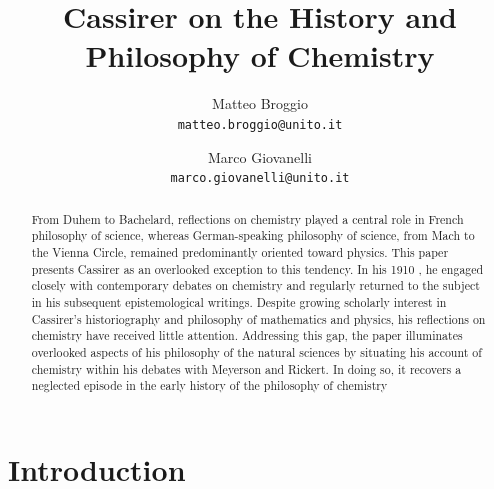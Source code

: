 \documentclass[submitted,12pt]{article}
\title{\DIFaddbegin \DIFadd{Ernst }\DIFaddend Cassirer on the History and Philosophy of Chemistry}
\author{\small
Matteo Broggio\\
  \texttt{matteo.broggio@unito.it}
  \and
\small  Marco Giovanelli\\
  \texttt{marco.giovanelli@unito.it}
}
\begin{document}
\maketitle


\begin{abstract}
From Duhem to Bachelard, reflections on chemistry played a central role in French philosophy of science, whereas German-speaking philosophy of science, from Mach to the Vienna Circle, remained predominantly oriented toward physics. This paper presents Cassirer as an overlooked exception to this tendency. In his 1910 \SFt, he engaged closely with contemporary debates on chemistry and regularly returned to the subject in his subsequent epistemological writings. Despite growing scholarly interest in Cassirer’s historiography and philosophy of mathematics and physics, his reflections on chemistry have received little attention. Addressing this gap, the paper illuminates overlooked aspects of his philosophy of the natural sciences by situating his account of chemistry within his debates with Meyerson and Rickert. In doing so, it recovers a neglected episode in the early history of the philosophy of chemistry
\end{abstract}

\section*{Introduction}
\end{document}
